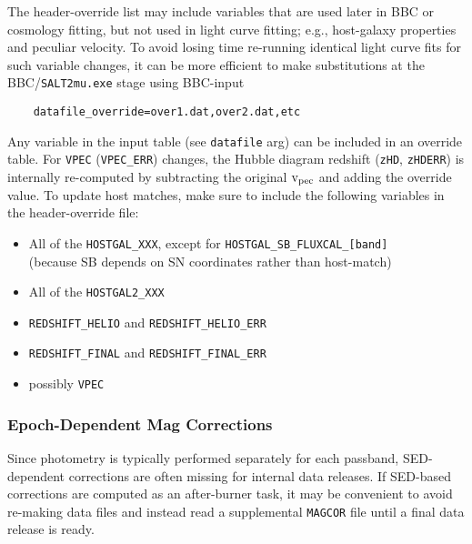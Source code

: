 \documentclass[12pt]{article}
\newcommand{\vpec}{{\rm v}_{\rm pec}}
\begin{document}
The header-override list may include variables that are used later in 
BBC or cosmology fitting, but not used in light curve fitting;
e.g., host-galaxy properties and peculiar velocity. To avoid 
losing time re-running identical light curve fits for such variable changes,
it can be more efficient to make substitutions at the 
BBC/{\tt SALT2mu.exe} stage using BBC-input 
\vspace{-0.2cm}
\begin{verbatim}
    datafile_override=over1.dat,over2.dat,etc
\end{verbatim}
Any variable in the input table (see {\tt datafile} arg) can be
included in an override table.
For {\tt VPEC} ({\tt VPEC\_ERR}) changes, the Hubble diagram 
redshift ({\tt zHD}, {\tt zHDERR}) is internally re-computed by subtracting
the original $\vpec$ and adding the override value.
To update host matches, make sure to include the following variables
in the header-override file:
\vspace{-0.1cm}
\begin{itemize}[noitemsep]
   \item All of the {\tt HOSTGAL\_XXX},
            except for {\tt HOSTGAL\_SB\_FLUXCAL\_[band]} \\
     (because SB depends on SN coordinates rather than host-match)
   \item All of the {\tt HOSTGAL2\_XXX}
   \item {\tt REDSHIFT\_HELIO} and {\tt REDSHIFT\_HELIO\_ERR}
   \item {\tt REDSHIFT\_FINAL} and {\tt REDSHIFT\_FINAL\_ERR}
   \item possibly {\tt VPEC}
\end{itemize}

\clearpage
\subsubsection{Epoch-Dependent Mag Corrections}
\label{sss:magcor}

Since photometry is typically performed separately for each passband,
SED-dependent corrections are often missing for internal data
releases. If SED-based corrections are computed as an after-burner
task, it may be convenient to avoid re-making data files and instead
read a supplemental {\tt MAGCOR} file until a final data release is ready.
\end{document}

